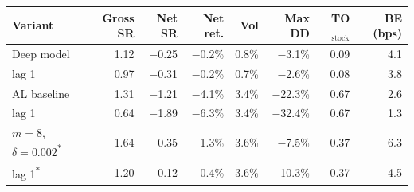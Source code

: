 \setlength{\tabcolsep}{4pt}
\begin{tabular}{@{}lrrrrrrr@{}}
\toprule
Variant & Gross SR & Net SR & Net ret. & Vol & Max DD & TO$_{\text{stock}}$ & BE (bps)\\
\midrule
Deep model & 1.12 & \ensuremath{-}0.25 & \ensuremath{-}0.2\% & 0.8\% & \ensuremath{-}3.1\% & 0.09 & 4.1\\
\quad lag 1 & 0.97 & \ensuremath{-}0.31 & \ensuremath{-}0.2\% & 0.7\% & \ensuremath{-}2.6\% & 0.08 & 3.8\\
\midrule
AL baseline & 1.31 & \ensuremath{-}1.21 & \ensuremath{-}4.1\% & 3.4\% & \ensuremath{-}22.3\% & 0.67 & 2.6\\
\quad lag 1 & 0.64 & \ensuremath{-}1.89 & \ensuremath{-}6.3\% & 3.4\% & \ensuremath{-}32.4\% & 0.67 & 1.3\\
\midrule
$m=8$, $\delta=0.002$\textsuperscript{*} & 1.64 & 0.35 & 1.3\% & 3.6\% & \ensuremath{-}7.5\% & 0.37 & 6.3\\
\quad lag 1\textsuperscript{*} & 1.20 & \ensuremath{-}0.12 & \ensuremath{-}0.4\% & 3.6\% & \ensuremath{-}10.3\% & 0.37 & 4.5\\
\bottomrule
\end{tabular}
